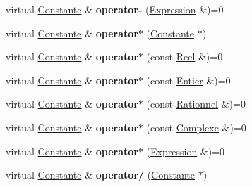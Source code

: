 \begin{DoxyCompactItemize}
\item 
\hypertarget{class_constante_aca98518ee0933a3eabe01da0739e36be}{virtual \hyperlink{class_constante}{Constante} \& {\bfseries operator-\/} (\hyperlink{class_expression}{Expression} \&)=0}\label{class_constante_aca98518ee0933a3eabe01da0739e36be}

\item 
\hypertarget{class_constante_a4293c8632cc246b0e88285ae4afd2128}{virtual \hyperlink{class_constante}{Constante} \& {\bfseries operator$\ast$} (\hyperlink{class_constante}{Constante} $\ast$)}\label{class_constante_a4293c8632cc246b0e88285ae4afd2128}

\item 
\hypertarget{class_constante_a44b5993c7da0b9e89a40980f2bcb8f1e}{virtual \hyperlink{class_constante}{Constante} \& {\bfseries operator$\ast$} (const \hyperlink{class_reel}{Reel} \&)=0}\label{class_constante_a44b5993c7da0b9e89a40980f2bcb8f1e}

\item 
\hypertarget{class_constante_aeabf86524c5dca456de99068eff0faa0}{virtual \hyperlink{class_constante}{Constante} \& {\bfseries operator$\ast$} (const \hyperlink{class_entier}{Entier} \&)=0}\label{class_constante_aeabf86524c5dca456de99068eff0faa0}

\item 
\hypertarget{class_constante_a4b7d7328c364c30e53c5045eea6fe58c}{virtual \hyperlink{class_constante}{Constante} \& {\bfseries operator$\ast$} (const \hyperlink{class_rationnel}{Rationnel} \&)=0}\label{class_constante_a4b7d7328c364c30e53c5045eea6fe58c}

\item 
\hypertarget{class_constante_a65a3360420827c4c7953052ff87b2457}{virtual \hyperlink{class_constante}{Constante} \& {\bfseries operator$\ast$} (const \hyperlink{class_complexe}{Complexe} \&)=0}\label{class_constante_a65a3360420827c4c7953052ff87b2457}

\item 
\hypertarget{class_constante_a51016ec3398e1a5f2ba4cea752c5c7db}{virtual \hyperlink{class_constante}{Constante} \& {\bfseries operator$\ast$} (\hyperlink{class_expression}{Expression} \&)=0}\label{class_constante_a51016ec3398e1a5f2ba4cea752c5c7db}

\item 
\hypertarget{class_constante_a9be1827fd118f5a81cf10b509b64cfa7}{virtual \hyperlink{class_constante}{Constante} \& {\bfseries operator/} (\hyperlink{class_constante}{Constante} $\ast$)}\label{class_constante_a9be1827fd118f5a81cf10b509b64cfa7}


\end{DoxyCompactItemize}
